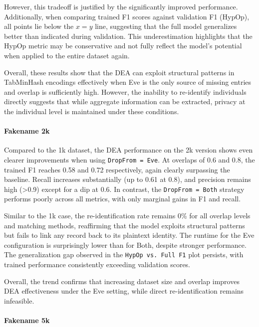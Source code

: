 However, this tradeoff is justified by the significantly improved performance.
Additionally, when comparing trained F1 scores against validation F1 (HypOp), all points lie below the $x = y$ line, suggesting that the full model generalizes better than indicated during validation.
This underestimation highlights that the HypOp metric may be conservative and not fully reflect the model’s potential when applied to the entire dataset again.

Overall, these results show that the DEA can exploit structural patterns in TabMinHash encodings effectively when Eve is the only source of missing entries and overlap is sufficiently high.
However, the inability to re-identify individuals directly suggests that while aggregate information can be extracted, privacy at the individual level is maintained under these conditions.

\paragraph{Fakename 2k}

Compared to the 1k dataset, the DEA performance on the 2k version shows even clearer improvements when using \texttt{DropFrom = Eve}.
At overlaps of 0.6 and 0.8, the trained F1 reaches 0.58 and 0.72 respectively, again clearly surpassing the baseline.
Recall increases substantially (up to 0.61 at 0.8), and precision remains high (>0.9) except for a dip at 0.6.
In contrast, the \texttt{DropFrom = Both} strategy performs poorly across all metrics, with only marginal gains in F1 and recall.

Similar to the 1k case, the re-identification rate remains 0\% for all overlap levels and matching methods, reaffirming that the model exploits structural patterns but fails to link any record back to its plaintext identity.
The runtime for the Eve configuration is surprisingly lower than for Both, despite stronger performance.
The generalization gap observed in the \texttt{HypOp vs. Full F1} plot persists, with trained performance consistently exceeding validation scores.

Overall, the trend confirms that increasing dataset size and overlap improves DEA effectiveness under the Eve setting, while direct re-identification remains infeasible.

\paragraph{Fakename 5k}

